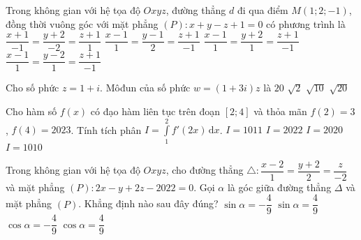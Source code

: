 \begin{ex}%
Trong không gian với hệ tọa độ $Oxyz$, đường thẳng $d$ đi qua điểm $M(1;2;-1)$, đồng thời vuông góc với mặt phẳng $(P)\colon x+y-z+1=0$ có phương trình là
\choice
{$\dfrac{x+1}{-1}=\dfrac{y+2}{-2}=\dfrac{z+1}{1}$}
{$\dfrac{x-1}{1}=\dfrac{y-1}{2}=\dfrac{z+1}{-1}$}
{$\dfrac{x-1}{1}=\dfrac{y+2}{1}=\dfrac{z+1}{-1}$}
{\True $\dfrac{x-1}{1}=\dfrac{y-2}{1}=\dfrac{z+1}{-1}$}
\end{ex}


\begin{ex}%
Cho số phức $z=1+i$. Môđun của số phức $w=(1+3i)z$ là
\choice
{$ 20 $}
{$\sqrt{2}$}
{$\sqrt{10}$}
{\True $\sqrt{20}$}
\end{ex}


\begin{ex}%
Cho hàm số $f(x)$ có đạo hàm liên tục trên đoạn $[2;4]$ và thỏa mãn $f(2)=3$, $f(4)=2023$. Tính tích phân $I=\displaystyle\int\limits_1^2{f'(2x)\mathrm{\,d}x}$.
\choice
{$I=1011$}
{$I=2022$}
{$I=2020$}
{\True $I=1010$}
\end{ex}


\begin{ex}%
Trong không gian với hệ tọa độ $Oxyz$, cho đường thẳng $\triangle \colon \dfrac{x-2}{1}=\dfrac{y+2}{2}=\dfrac{z}{-2}$ và mặt phẳng $(P)\colon 2x-y+2z-2022=0$. Gọi $\alpha $ là góc giữa đường thẳng $\Delta $ và mặt phẳng $(P)$. Khẳng định nào sau đây đúng?
\choice
{$\sin \alpha =-\dfrac{4}{9}$}
{\True $\sin \alpha =\dfrac{4}{9}$}
{$\cos \alpha =-\dfrac{4}{9}$}
{$\cos \alpha =\dfrac{4}{9}$}
\end{ex}


